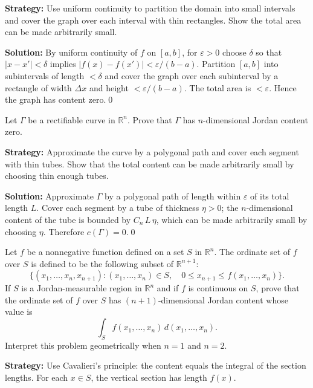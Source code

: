 \noindent\textbf{Strategy:} Use uniform continuity to partition the domain into small intervals and cover the graph over each interval with thin rectangles. Show the total area can be made arbitrarily small.

\bigskip\noindent\textbf{Solution:}
By uniform continuity of $f$ on $[a,b]$, for $\varepsilon>0$ choose $\delta$ so that $|x-x'|<\delta$ implies $|f(x)-f(x')|<\varepsilon/(b-a)$. Partition $[a,b]$ into subintervals of length $<\delta$ and cover the graph over each subinterval by a rectangle of width $\Delta x$ and height $<\varepsilon/(b-a)$. The total area is $<\varepsilon$. Hence the graph has content zero.\qed


\begin{problembox}
Let \( \Gamma \) be a rectifiable curve in \( \mathbb{R}^n \). Prove that \( \Gamma \) has \( n \)-dimensional Jordan content zero.
\end{problembox}

\noindent\textbf{Strategy:} Approximate the curve by a polygonal path and cover each segment with thin tubes. Show that the total content can be made arbitrarily small by choosing thin enough tubes.

\bigskip\noindent\textbf{Solution:}
Approximate $\Gamma$ by a polygonal path of length within $\varepsilon$ of its total length $L$. Cover each segment by a tube of thickness $\eta>0$; the $n$-dimensional content of the tube is bounded by $C_n\,L\,\eta$, which can be made arbitrarily small by choosing $\eta$. Therefore $c(\Gamma)=0$.\qed


\begin{problembox}
Let \( f \) be a nonnegative function defined on a set \( S \) in \( \mathbb{R}^n \). The ordinate set of \( f \) over \( S \) is defined to be the following subset of \( \mathbb{R}^{n+1} \):
\[\{(x_1, \ldots, x_n, x_{n+1}) : (x_1, \ldots, x_n) \in S, \quad 0 \leq x_{n+1} \leq f(x_1, \ldots, x_n)\}.\]
If \( S \) is a Jordan-measurable region in \( \mathbb{R}^n \) and if \( f \) is continuous on \( S \), prove that the ordinate set of \( f \) over \( S \) has \( (n + 1) \)-dimensional Jordan content whose value is
\[\int_{S} f(x_1, \ldots, x_n) \, d(x_1, \ldots, x_n).\]
Interpret this problem geometrically when \( n = 1 \) and \( n = 2 \).
\end{problembox}

\noindent\textbf{Strategy:} Use Cavalieri's principle: the content equals the integral of the section lengths. For each $x\in S$, the vertical section has length $f(x)$.

